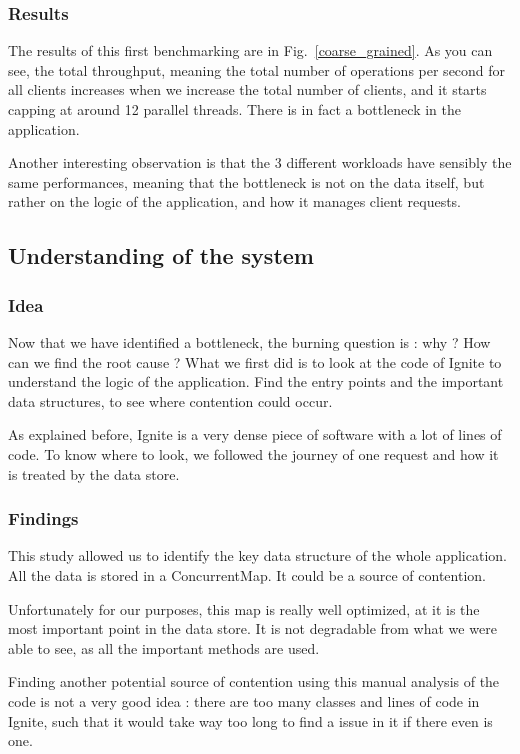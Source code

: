 \documentclass[conference]{IEEEtran}
\begin{document}
\subsubsection{Results}



The results of this first benchmarking are in Fig.~\ref{coarse_grained}.
As you can see, the total throughput, meaning the total number of operations per second for all clients increases when we increase the total number of clients, and it starts capping at around 12 parallel threads. There is in fact a bottleneck in the application.

Another interesting observation is that the 3 different workloads have sensibly the same performances, meaning that the bottleneck is not on the data itself, but rather on the logic of the application, and how it manages client requests.

\subsection{Understanding of the system}
\subsubsection{Idea}
Now that we have identified a bottleneck, the burning question is : why ? How can we find the root cause ?
What we first did is to look at the code of Ignite to understand the logic of the application. Find the entry points and the important data structures, to see where contention could occur.

As explained before, Ignite is a very dense piece of software with a lot of lines of code. To know where to look, we followed the journey of one request and how it is treated by the data store.

\subsubsection{Findings}
This study allowed us to identify the key data structure of the whole application. All the data is stored in a ConcurrentMap. It could be a source of contention.

Unfortunately for our purposes, this map is really well optimized, at it is the most important point in the data store. It is not degradable from what we were able to see, as all the important methods are used. 

Finding another potential source of contention using this manual analysis of the code is not a very good idea : there are too many classes and lines of code in Ignite, such that it would take way too long to find a issue in it if there even is one. 
\end{document}
